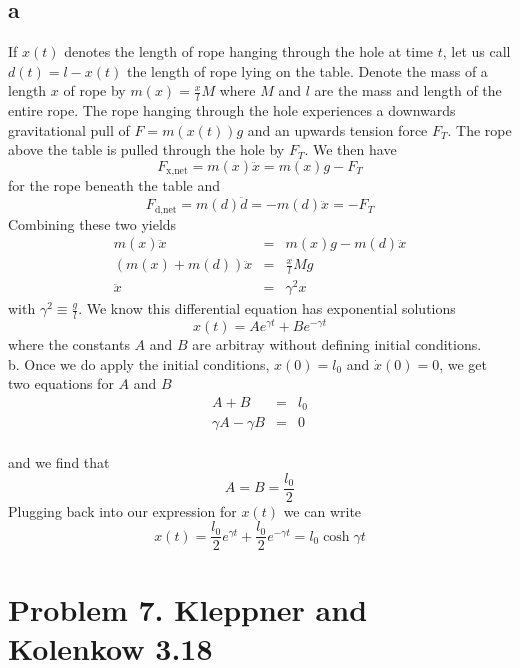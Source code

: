 \documentclass[11pt]{article}
\begin{document}
\subsection*{a}
If $x(t)$ denotes the length of rope hanging through the hole at time $t$, let us call $d(t) = l - x(t)$ the length of rope lying on the table. Denote the mass of a length $x$ of rope by $m(x) = \frac{x}{l}M$ where $M$ and $l$ are the mass and length of the entire rope. The rope hanging through the hole experiences a downwards gravitational pull of $F = m(x(t))g$ and an upwards tension force $F_T$. The rope above the table is pulled through the hole by $F_T$. We then have
$$F_{\textrm{x,net}} = m(x)\ddot{x} = m(x)g - F_T$$
for the rope beneath the table and
$$F_{\textrm{d,net}} = m(d)\ddot{d} = -m(d)\ddot{x} = -F_T$$
Combining these two yields
\begin{eqnarray*}
m(x)\ddot{x} &=& m(x)g - m(d)\ddot{x}\\
(m(x) + m(d))\ddot{x} &=& \frac{x}{l}Mg\\
\ddot{x} &=& \gamma^2 x
\end{eqnarray*}
with $\gamma^2 \equiv \frac{g}{l}$. We know this differential equation has exponential solutions \\
$$x(t) = A e^{\gamma t} + B e^{-\gamma t}$$
where the constants $A$ and $B$ are arbitray without defining initial conditions. \\
b. Once we do apply the initial conditions, $x(0) = l_0$ and $\dot{x}(0) = 0$, we get two equations for $A$ and $B$ \\
\begin{eqnarray*}
A + B &=& l_0\\
\gamma A - \gamma B &=& 0
\end{eqnarray*} \\
and we find that 
$$A = B = \frac{l_0}{2}$$
Plugging back into our expression for $x(t)$ we can write
$$x(t) = \frac{l_0}{2}e^{\gamma t} + \frac{l_0}{2}e^{-\gamma t} = l_0 \cosh{\gamma t}$$

\section*{Problem 7. Kleppner and Kolenkow 3.18}
\end{document}
